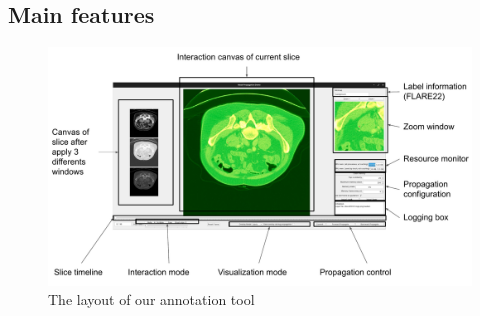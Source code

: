 \subsection{Main features}
\begin{figure}[!h]
    \centering
    \includegraphics[width=\textwidth]{content/resources/new_images/application/GUI.pdf}
    \caption{The layout of our annotation tool}
    \label{fig:gui_app}
\end{figure}




